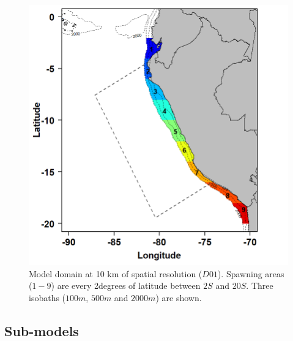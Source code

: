 \begin{figure}[ht]
	\includegraphics[width=1.0\textwidth]{figures/Fig3_01.png}
	\centering
	\caption{Model domain at 10 km of spatial resolution ($D01$). Spawning areas ($1 - 9$) are every 2\textdegree degrees of latitude between $2$\textdegree $S$ and $20$\textdegree $S$. Three isobaths ($100 m$, $500 m$ and $2000 m$) are shown.}
	\label{Fig3_01}
\end{figure}

\subsection{Sub-models}

